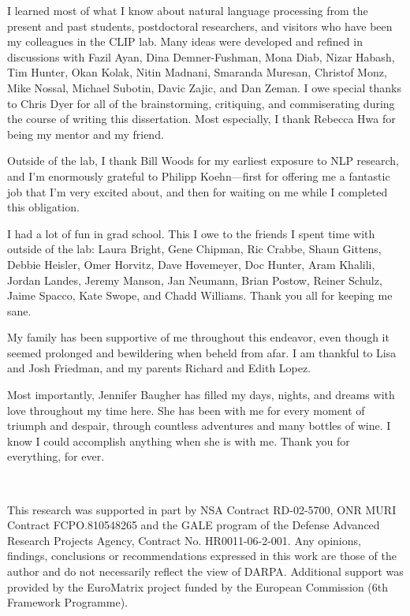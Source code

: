 I learned most of what I know about natural language processing from the present and past students, postdoctoral researchers, and visitors who have been my colleagues in the CLIP lab.  Many ideas were developed and refined in discussions with
Fazil Ayan,
Dina Demner-Fushman,
Mona Diab,
Nizar Habash,
Tim Hunter,
Okan Kolak,
Nitin Madnani,
Smaranda Muresan,
Christof Monz,
Mike Nossal,
Michael Subotin,
Davic Zajic, and
Dan Zeman.
I owe special thanks to Chris Dyer for all of the brainstorming, critiquing, and commiserating during the course of writing this dissertation.  Most especially, I thank Rebecca Hwa for being my mentor and my friend.

Outside of the lab, I thank Bill Woods for my earliest exposure to NLP research, and I'm enormously grateful to Philipp Koehn---first for offering me a fantastic job that I'm very excited about, and then for waiting on me while I completed this obligation.

I had a lot of fun in grad school.  This I owe to the friends I spent time with outside of the lab:
Laura Bright,
Gene Chipman,
Ric Crabbe,
Shaun Gittens,
Debbie Heisler,
Omer Horvitz,
Dave Hovemeyer,
Doc Hunter,
Aram Khalili,
Jordan Landes,
Jeremy Manson,
Jan Neumann,
Brian Postow,
Reiner Schulz,
Jaime Spacco,
Kate Swope, and
Chadd Williams.
Thank you all for keeping me sane.

My family has been supportive of me throughout this endeavor, even though it seemed prolonged and bewildering when beheld from afar.  I am thankful to Lisa and Josh Friedman, and my parents Richard and Edith Lopez.

Most importantly, Jennifer Baugher has filled my days, nights, and dreams with love throughout my time here.  She has been with me for every moment of triumph and despair, through countless adventures and many bottles of wine.  I know I could accomplish anything when she is with me.  Thank you for everything, for ever.

\newpage
~
\vspace{1.5in}

This research was supported in part by NSA Contract RD-02-5700, ONR MURI Contract FCPO.810548265 and the GALE program of the Defense Advanced Research Projects Agency, Contract No. HR0011-06-2-001. 
Any opinions, findings, conclusions or recommendations expressed in this work are those of the author and do not necessarily reflect the view of DARPA.  
Additional support was provided by the EuroMatrix project funded by the European Commission (6th Framework Programme).


